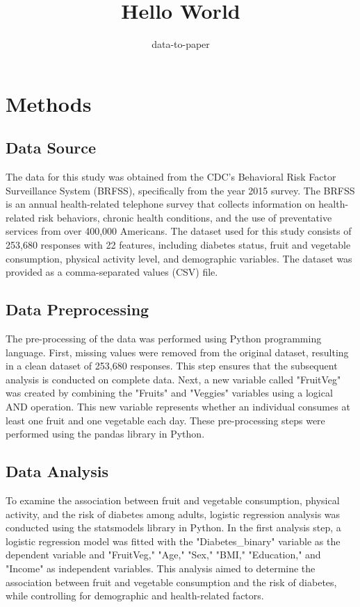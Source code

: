 \documentclass[12pt]{article}
\title{Hello World}
\author{data-to-paper}
\begin{document}
\maketitle

\section{Methods}

\subsection{Data Source}
The data for this study was obtained from the CDC's Behavioral Risk Factor Surveillance System (BRFSS), specifically from the year 2015 survey. The BRFSS is an annual health-related telephone survey that collects information on health-related risk behaviors, chronic health conditions, and the use of preventative services from over 400,000 Americans. The dataset used for this study consists of 253,680 responses with 22 features, including diabetes status, fruit and vegetable consumption, physical activity level, and demographic variables. The dataset was provided as a comma-separated values (CSV) file.

\subsection{Data Preprocessing}
The pre-processing of the data was performed using Python programming language. First, missing values were removed from the original dataset, resulting in a clean dataset of 253,680 responses. This step ensures that the subsequent analysis is conducted on complete data. Next, a new variable called "FruitVeg" was created by combining the "Fruits" and "Veggies" variables using a logical AND operation. This new variable represents whether an individual consumes at least one fruit and one vegetable each day. These pre-processing steps were performed using the pandas library in Python.

\subsection{Data Analysis}
To examine the association between fruit and vegetable consumption, physical activity, and the risk of diabetes among adults, logistic regression analysis was conducted using the statsmodels library in Python. In the first analysis step, a logistic regression model was fitted with the "Diabetes\_binary" variable as the dependent variable and "FruitVeg," "Age," "Sex," "BMI," "Education," and "Income" as independent variables. This analysis aimed to determine the association between fruit and vegetable consumption and the risk of diabetes, while controlling for demographic and health-related factors.
\end{document}
